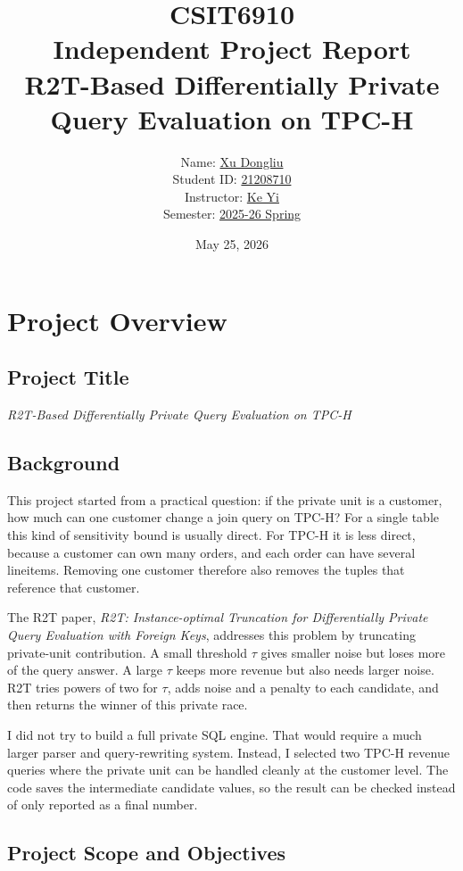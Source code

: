 \documentclass[12pt,a4paper]{report}
\title{
\textbf{CSIT6910}\\[6pt]
\Large Independent Project Report\\[6pt]
\textbf{R2T-Based Differentially Private Query Evaluation on TPC-H}
}
\author{
Name: \underline{Xu Dongliu}\\
Student ID: \underline{21208710}\\[6pt]
Instructor: \underline{Ke Yi}\\
Semester: \underline{2025-26 Spring}
}
\date{May 25, 2026}
\begin{document}
\maketitle
\tableofcontents
\newpage

\chapter{Project Overview}

\section{Project Title}
\textit{R2T-Based Differentially Private Query Evaluation on TPC-H}

\section{Background}

This project started from a practical question: if the private unit is a
customer, how much can one customer change a join query on TPC-H?  For a
single table this kind of sensitivity bound is usually direct.  For
TPC-H it is less direct, because a customer can own many orders, and each
order can have several lineitems.  Removing one customer therefore also
removes the tuples that reference that customer.

The R2T paper, \textit{R2T: Instance-optimal Truncation for
Differentially Private Query Evaluation with Foreign Keys}, addresses
this problem by truncating private-unit contribution.  A small threshold
$\tau$ gives smaller noise but loses more of the query answer.  A large
$\tau$ keeps more revenue but also needs larger noise.  R2T tries powers
of two for $\tau$, adds noise and a penalty to each candidate, and then
returns the winner of this private race.

I did not try to build a full private SQL engine.  That would require a
much larger parser and query-rewriting system.  Instead, I selected two
TPC-H revenue queries where the private unit can be handled cleanly at
the customer level.  The code saves the intermediate candidate values, so
the result can be checked instead of only reported as a final number.

\section{Project Scope and Objectives}
\end{document}
